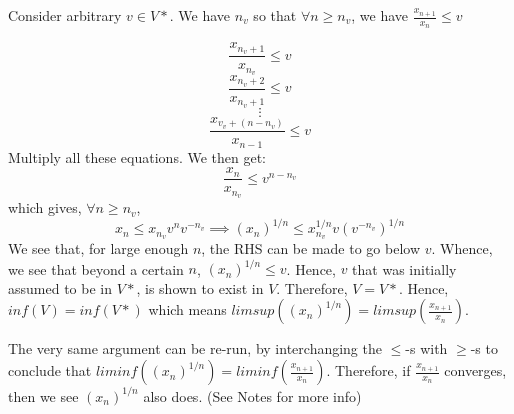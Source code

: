 \documentclass[../Main.tex]{subfiles}
\begin{document}
Consider arbitrary $v \in V*$. We have $n_v$ so that
$\forall n \geq n_v$, we have $\frac{x_{n+1}}{x_n} \leq v$

$$\frac{x_{n_v+1}}{x_{n_v}}\leq v$$
$$\frac{x_{n_v+2}}{x_{n_v+1}}\leq v$$
$$ \vdots$$
$$\frac{x_{v_v+(n-n_v)}}{x_{n-1}} \leq v$$
Multiply all these equations. We then get:
$$\frac{x_n}{x_{n_v}}\leq v^{n-n_v} $$
which gives, $\forall n \geq n_v$, $$x_n \leq x_{n_v}v^n v^{-n_v} \implies (x_n)^{1/n} \leq x_{n_v}^{1/n}v (v^{-n_v})^{1/n} $$
We see that, for large enough $n$, the RHS can be made to go below $v$. Whence, we 
see that beyond a certain $n$,  $(x_n)^{1/n}\leq v$. Hence,
$v$ that was initially assumed to be in $V*$, is shown to 
exist in $V$. Therefore, $V=V*$. Hence, $inf(V)=inf(V*)$ which
means $limsup((x_n)^{1/n})=limsup(\frac{x_{n+1}}{x_n})$.

The very same argument can be re-run, by interchanging the $\leq$-s with $\geq$-s to conclude that
$liminf((x_n)^{1/n})=liminf(\frac{x_{n+1}}{x_n})$. Therefore, if $\frac{x_{n+1}}{x_n}$
converges, then we see $(x_n)^{1/n}$ also does. (See Notes for more info)
\end{document}
